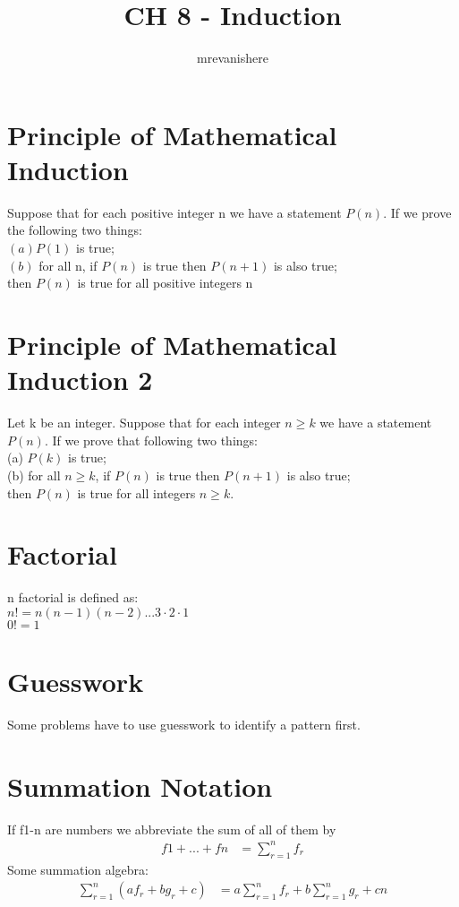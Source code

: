 \documentclass[12pt]{article}
\begin{document}
\title{CH 8 - Induction}
\author{mrevanishere}
\maketitle


\section{Principle of Mathematical Induction}
	Suppose that for each positive integer n we have a statement $ P(n) $.
	If we prove the following two things: \\
	$ (a) P(1)$ is true;\\
	$ (b) $ for all n, if $ P(n) $ is true then $ P(n+1) $ is also true;\\
	then $ P(n) $ is true for all positive integers n 
\section{Principle of Mathematical Induction 2}
	Let k be an integer. Suppose that for each integer $ n \ge k $ we have a 
	statement $ P(n) $. If we prove that following two things:\\
	(a) $ P(k) $ is true; \\
	(b) for all $ n \ge k $, if $ P(n) $ is true then $ P(n+1) $ is also true;\\
	then $ P(n) $ is true for all integers $ n \ge k $.
\section{Factorial}
	n factorial is defined as:\\
	$ n! = n(n-1)(n-2)...3\cdot 2\cdot 1 $ \\
	$ 0! = 1 $
\section{Guesswork}
	Some problems have to use guesswork to identify a pattern first.
\section{Summation Notation}
	If f1-n are numbers we abbreviate the sum of all of them by
	\begin{align*}
		f1 + ...+fn &= \sum^{n}_{r=1}f_r
	\end{align*}
	Some summation algebra:
	\begin{align*}
		\sum^n_{r=1}(af_r + bg_r +c) &= 
		a\sum^n_{r=1}f_r +b\sum^n_{r=1}g_r + cn
	\end{align*}
\end{document}
